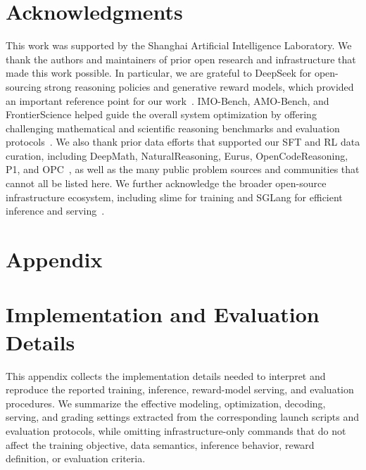 \documentclass{llmxive}
\providecommand{\addcontentsline}[3]{}
\begin{document}
\section*{Acknowledgments}
This work was supported by the Shanghai Artificial Intelligence Laboratory. 
We thank the authors and maintainers of prior open research and infrastructure
that made this work possible. 
In particular, we are
grateful to DeepSeek for open-sourcing strong reasoning policies and generative reward models, which provided an important
reference point for our work~\citep{deepseekai2025deepseekv32,deepseekmathv2}.
IMO-Bench, AMO-Bench, and FrontierScience
helped guide the overall system optimization by offering challenging
mathematical and scientific reasoning benchmarks and evaluation
protocols~\citep{luong2025imobench,an2025amobench,wang2026frontierscience}. We
also thank prior data efforts that supported our SFT and RL data curation,
including DeepMath, NaturalReasoning, Eurus, OpenCodeReasoning, P1, and
OPC~\citep{he2025deepmath,yuan2025naturalreasoning,cui2025process,ahmad2025opencodereasoning,chen2025p1,dekoninck2025opc},
as well as the many public problem sources and communities that cannot all be
listed here. We further acknowledge the broader open-source infrastructure
ecosystem, including slime for training and SGLang for efficient inference and
serving~\citep{thudm2026slime,sglang2026repo}. 






\appendix


\section*{Appendix}
\addcontentsline{toc}{part}{Appendix}  %

\startcontents[appendix]

\section{Implementation and Evaluation Details}
\label{app:training-details}

This appendix collects the implementation details needed to interpret and
reproduce the reported training, inference, reward-model serving, and evaluation
procedures. We summarize the effective modeling, optimization, decoding,
serving, and grading settings extracted from the corresponding launch scripts
and evaluation protocols, while omitting infrastructure-only commands that do
not affect the training objective, data semantics, inference behavior, reward
definition, or evaluation criteria.
\end{document}
